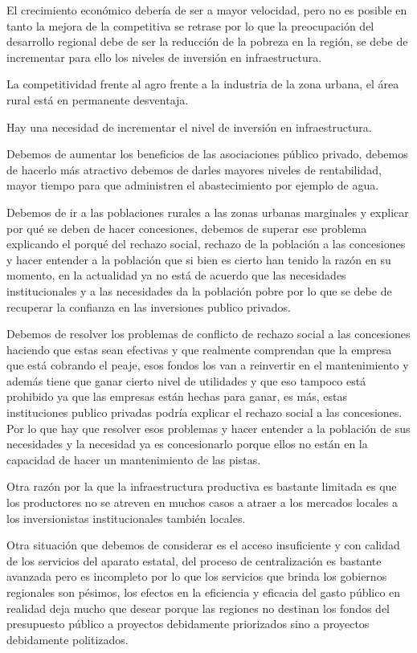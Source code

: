 \documentclass[
  jou,
  floatsintext,
  longtable,
  a4paper,
  nolmodern,
  notxfonts,
  notimes,
  12pt,
  colorlinks=true,linkcolor=blue,citecolor=blue,urlcolor=blue]{apa7}
\begin{document}
El crecimiento económico debería de ser a mayor velocidad, pero no es
posible en tanto la mejora de la competitiva se retrase por lo que la
preocupación del desarrollo regional debe de ser la reducción de la
pobreza en la región, se debe de incrementar para ello los niveles de
inversión en infraestructura.

La competitividad frente al agro frente a la industria de la zona
urbana, el área rural está en permanente desventaja.

Hay una necesidad de incrementar el nivel de inversión en
infraestructura.

Debemos de aumentar los beneficios de las asociaciones público privado,
debemos de hacerlo más atractivo debemos de darles mayores niveles de
rentabilidad, mayor tiempo para que administren el abastecimiento por
ejemplo de agua.

Debemos de ir a las poblaciones rurales a las zonas urbanas marginales y
explicar por qué se deben de hacer concesiones, debemos de superar ese
problema explicando el porqué del rechazo social, rechazo de la
población a las concesiones y hacer entender a la población que si bien
es cierto han tenido la razón en su momento, en la actualidad ya no está
de acuerdo que las necesidades institucionales y a las necesidades da la
población pobre por lo que se debe de recuperar la confianza en las
inversiones publico privados.

Debemos de resolver los problemas de conflicto de rechazo social a las
concesiones haciendo que estas sean efectivas y que realmente comprendan
que la empresa que está cobrando el peaje, esos fondos los van a
reinvertir en el mantenimiento y además tiene que ganar cierto nivel de
utilidades y que eso tampoco está prohibido ya que las empresas están
hechas para ganar, es más, estas instituciones publico privadas podría
explicar el rechazo social a las concesiones. Por lo que hay que
resolver esos problemas y hacer entender a la población de sus
necesidades y la necesidad ya es concesionarlo porque ellos no están en
la capacidad de hacer un mantenimiento de las pistas.

Otra razón por la que la infraestructura productiva es bastante limitada
es que los productores no se atreven en muchos casos a atraer a los
mercados locales a los inversionistas institucionales también locales.

Otra situación que debemos de considerar es el acceso insuficiente y con
calidad de los servicios del aparato estatal, del proceso de
centralización es bastante avanzada pero es incompleto por lo que los
servicios que brinda los gobiernos regionales son pésimos, los efectos
en la eficiencia y eficacia del gasto público en realidad deja mucho que
desear porque las regiones no destinan los fondos del presupuesto
público a proyectos debidamente priorizados sino a proyectos debidamente
politizados.
\end{document}
